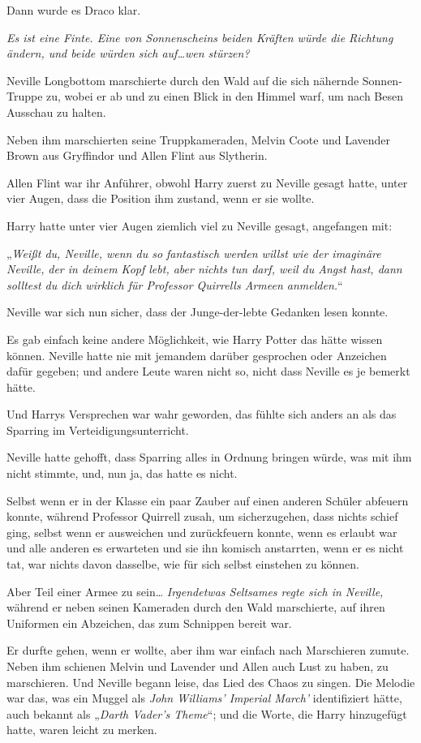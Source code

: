 {Dann wurde es Draco klar.

\emph{Es ist eine Finte. Eine von Sonnenscheins beiden Kräften würde die Richtung ändern, und beide würden sich auf…wen stürzen?}

Neville Longbottom marschierte durch den Wald auf die sich nähernde Sonnen-Truppe zu, wobei er ab und zu einen Blick in den Himmel warf, um nach Besen Ausschau zu halten.

Neben ihm marschierten seine Truppkameraden, Melvin Coote und Lavender Brown aus Gryffindor und Allen Flint aus Slytherin.

Allen Flint war ihr Anführer, obwohl Harry zuerst zu Neville gesagt hatte, unter vier Augen, dass die Position ihm zustand, wenn er sie wollte.

Harry hatte unter vier Augen ziemlich viel zu Neville gesagt, angefangen mit:

„\emph{Weißt du, Neville, wenn du so fantastisch werden willst wie der imaginäre Neville,} \emph{der in deinem Kopf lebt, aber nichts tun darf, weil du Angst hast, dann solltest du dich wirklich für Professor Quirrells Armeen anmelden.}“

Neville war sich nun sicher, dass der Junge-der-lebte Gedanken lesen konnte.

Es gab einfach keine andere Möglichkeit, wie Harry Potter das hätte wissen können. Neville hatte nie mit jemandem darüber gesprochen oder Anzeichen dafür gegeben; und andere Leute waren nicht so, nicht dass Neville es je bemerkt hätte.

Und Harrys Versprechen war wahr geworden, das fühlte sich anders an als das Sparring im Verteidigungsunterricht.

Neville hatte gehofft, dass Sparring alles in Ordnung bringen würde, was mit ihm nicht stimmte, und, nun ja, das hatte es nicht.

Selbst wenn er in der Klasse ein paar Zauber auf einen anderen Schüler abfeuern konnte, während Professor Quirrell zusah, um sicherzugehen, dass nichts schief ging, selbst wenn er ausweichen und zurückfeuern konnte, wenn es erlaubt war und alle anderen es erwarteten und sie ihn komisch anstarrten, wenn er es nicht tat, war nichts davon dasselbe, wie für sich selbst einstehen zu können.

Aber Teil einer Armee zu sein… \emph{Irgendetwas Seltsames regte sich in Neville,} während er neben seinen Kameraden durch den Wald marschierte, auf ihren Uniformen ein Abzeichen, das zum Schnippen bereit war.

Er durfte gehen, wenn er wollte, aber ihm war einfach nach Marschieren zumute. Neben ihm schienen Melvin und Lavender und Allen auch Lust zu haben, zu marschieren. Und Neville begann leise, das Lied des Chaos zu singen. Die Melodie war das, was ein Muggel als \emph{John Williams' Imperial March'} identifiziert hätte, auch bekannt als „\emph{Darth Vader's Theme}“; und die Worte, die Harry hinzugefügt hatte, waren leicht zu merken.

}
